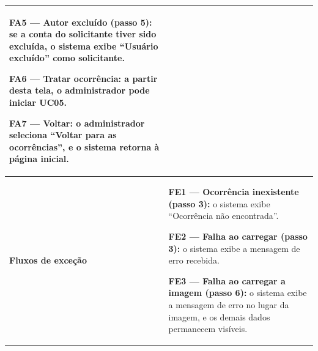 \documentclass[12pt,a4paper]{article}
\begin{document}
\begin{longtable}{|p{}|p{}|}
\par\smallskip\noindent \textbf{FA5 — Autor excluído (passo 5):} se a conta do solicitante tiver sido excluída, o sistema exibe ``Usuário excluído'' como solicitante.
\par\smallskip\noindent \textbf{FA6 — Tratar ocorrência:} a partir desta tela, o administrador pode iniciar UC05.
\par\smallskip\noindent \textbf{FA7 — Voltar:} o administrador seleciona ``Voltar para as ocorrências'', e o sistema retorna à página inicial. \\ \hline
\textbf{Fluxos de exceção} &
\noindent \textbf{FE1 — Ocorrência inexistente (passo 3):} o sistema exibe ``Ocorrência não encontrada''.
\par\smallskip\noindent \textbf{FE2 — Falha ao carregar (passo 3):} o sistema exibe a mensagem de erro recebida.
\par\smallskip\noindent \textbf{FE3 — Falha ao carregar a imagem (passo 6):} o sistema exibe a mensagem de erro no lugar da imagem, e os demais dados permanecem visíveis. \\
\end{longtable}
\end{document}
